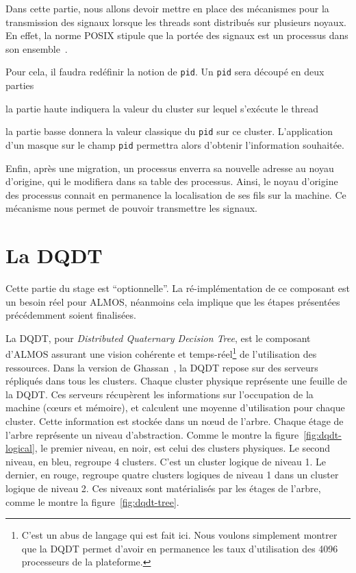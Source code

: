       Dans cette partie, nous allons devoir mettre en place des mécanismes pour
      la transmission des signaux lorsque les threads sont distribués sur
      plusieurs noyaux. En effet, la norme POSIX stipule que la portée des
      signaux est un processus dans son ensemble~\citep{man2015signal}.

      Pour cela, il faudra redéfinir la notion de \texttt{pid}. Un \texttt{pid}
      sera découpé en deux parties \benumline \item la partie haute indiquera la
      valeur du cluster sur lequel s'exécute le thread \item la partie basse
      donnera la valeur classique du \texttt{pid} sur ce
      cluster\eenumline. L'application d'un masque sur le champ \texttt{pid}
      permettra alors d'obtenir l'information souhaitée.

      Enfin, après une migration, un processus enverra sa nouvelle adresse au
      noyau d'origine, qui le modifiera dans sa table des processus. Ainsi, le
      noyau d'origine des processus connait en permanence la localisation de ses
      fils sur la machine. Ce mécanisme nous permet de pouvoir transmettre les
      signaux.


  \section{La DQDT}
  \label{sec:dqdt}

    Cette partie du stage est ``optionnelle''. La ré-implémentation de ce
    composant est un besoin réel pour ALMOS, néanmoins cela implique que les
    étapes présentées précédemment soient finalisées.

    La DQDT, pour \textit{Distributed Quaternary Decision Tree}, est le
    composant d'ALMOS assurant une vision cohérente et temps-réel\footnote{C'est
      un abus de langage qui est fait ici. Nous voulons simplement montrer que
      la DQDT permet d'avoir en permanence les taux d'utilisation des 4096
      processeurs de la plateforme.} de l'utilisation des ressources. Dans la
    version de Ghassan~\citet{almaless2014universite}, la DQDT repose sur des
    serveurs répliqués dans tous les clusters. Chaque cluster physique
    représente une feuille de la DQDT. Ces serveurs récupèrent les informations
    sur l'occupation de la machine (c\oe urs et mémoire), et calculent une
    moyenne d'utilisation pour chaque cluster. Cette information est stockée
    dans un n\oe ud de l'arbre. Chaque étage de l'arbre représente un niveau
    d'abstraction. Comme le montre la figure~\ref{fig:dqdt-logical}, le premier
    niveau, en noir, est celui des clusters physiques. Le second niveau, en
    bleu, regroupe 4 clusters. C'est un cluster logique de niveau 1. Le dernier,
    en rouge, regroupe quatre clusters logiques de niveau 1 dans un cluster
    logique de niveau 2. Ces niveaux sont matérialisés par les étages de
    l'arbre, comme le montre la figure~\ref{fig:dqdt-tree}.\\

